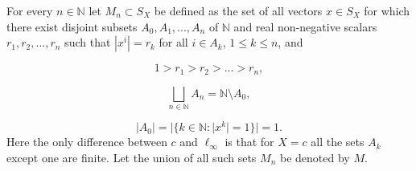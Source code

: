 \documentclass[reqno]{amsart}
\theoremstyle{plain}
\theoremstyle{remark}
\theoremstyle{definition}
\newcommand{\N}{\mathbb N}
\begin{document}
For every $n \in \N$ let $M_n\subset S_X$ be defined as the set of all vectors $x \in S_X$ for which there exist disjoint subsets $A_0,A_1,...,A_n$ of $\N$ and real non-negative scalars $r_1,r_2,...,r_n$ such that $|x^i|=r_k$ for all $i \in A_k$, $1\leq k \leq n$, and

\begin{equation}
    1>r_1 > r_2 >...> r_n,
\end{equation}

\begin{equation}
    \bigsqcup_{n\in \N }A_n = \N \setminus A_0,
\end{equation}

\begin{equation}
    |A_0|=|\{k \in \N :|x^k|=1\}|=1.
\end{equation}
Here the only difference between $c$ and $\ell_\infty$ is that for $X=c$ all the sets $A_k$ except one are finite.
Let the union of all such sets $M_n$ be denoted by $M$.
\end{document}
